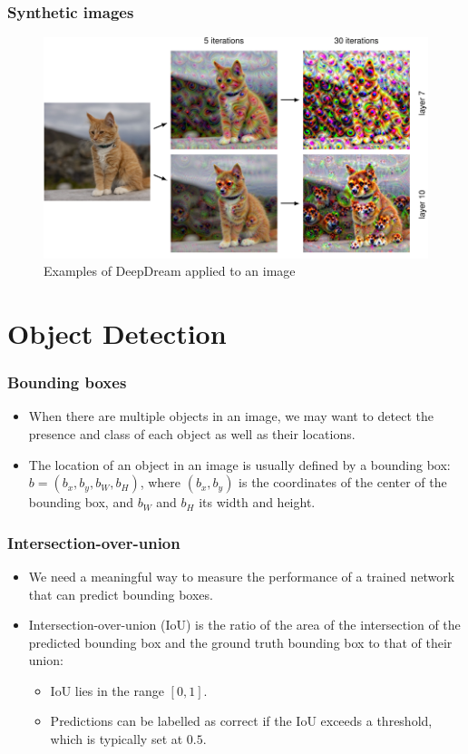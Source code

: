 \documentclass{beamer}
\begin{document}
\begin{frame}
    \frametitle{Synthetic images}
    \begin{figure}
        \caption{Examples of DeepDream applied to an image}
        \includegraphics[height=0.6\textheight]{Figure_18.pdf}
    \end{figure}
\end{frame}

\section{Object Detection}

\begin{frame}
    \frametitle{Bounding boxes}
    \begin{itemize}
        \item When there are multiple objects in an image, we may want to detect the presence and class of each object as well as their locations.
        \item The location of an object in an image is usually defined by a bounding box: $b=(b_{x},b_{y},b_{W},b_{H})$, where $(b_{x},b_{y})$ is the coordinates of the center of the bounding box, and $b_{W}$ and $b_{H}$ its width and height.
    \end{itemize}
\end{frame}

\begin{frame}
    \frametitle{Intersection-over-union}
    \begin{itemize}
        \item We need a meaningful way to measure the performance of a trained network that can predict bounding boxes.
        \item Intersection-over-union (IoU) is the ratio of the area of the intersection of the predicted bounding box and the ground truth bounding box to that of their union:
        \begin{itemize}
            \item IoU lies in the range $[0,1]$.
            \item Predictions can be labelled as correct if the IoU exceeds a threshold, which is typically set at $0.5$.
        \end{itemize}
    \end{itemize}
\end{frame}
\end{document}
